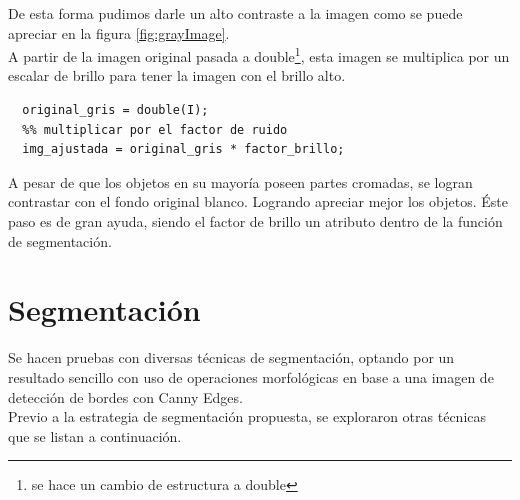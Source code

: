 \documentclass[a4paper, 11pt]{article}
\begin{document}
De esta forma pudimos darle un alto contraste a la imagen como se puede apreciar en la figura \ref{fig:grayImage}.\\

A partir de la imagen original pasada a double\footnote{se hace un cambio de estructura a double}, esta imagen se multiplica por un escalar de brillo para tener la imagen con el brillo alto.

\begin{lstlisting}[style=Matlab-editor, caption=Factor de brillo]
  %% pasar a double
  original_gris = double(I);
  %% multiplicar por el factor de ruido
  img_ajustada = original_gris * factor_brillo;
\end{lstlisting}

A pesar de que los objetos en su mayoría poseen partes cromadas, se logran contrastar con el fondo original blanco. Logrando apreciar mejor los objetos. Éste paso es de gran ayuda, siendo el factor de brillo un atributo dentro de la función de segmentación.
\pagebreak

\section{Segmentación}

Se hacen pruebas con diversas técnicas de segmentación, optando por un resultado sencillo con uso de operaciones morfológicas en base a una imagen de detección de bordes con Canny Edges.\\

Previo a la estrategia de segmentación propuesta, se exploraron otras técnicas que se listan a continuación.\\
\end{document}

